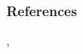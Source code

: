 \documentclass{beamer}
\begin{document}




\begin{frame}[t]\frametitle{References}
\cite{dawson2005projects}, \cite{weaver2004success}



\end{frame}
\end{document}
